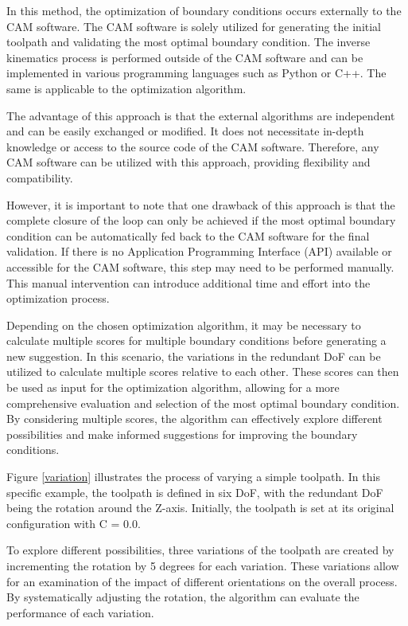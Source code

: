 In this method, the optimization of boundary conditions occurs externally to the CAM software. The CAM software is solely utilized for generating the initial toolpath and validating the most optimal boundary condition. The inverse kinematics process is performed outside of the CAM software and can be implemented in various programming languages such as Python or C++. The same is applicable to the optimization algorithm.

The advantage of this approach is that the external algorithms are independent and can be easily exchanged or modified. It does not necessitate in-depth knowledge or access to the source code of the CAM software. Therefore, any CAM software can be utilized with this approach, providing flexibility and compatibility.    

However, it is important to note that one drawback of this approach is that the complete closure of the loop can only be achieved if the most optimal boundary condition can be automatically fed back to the CAM software for the final validation. If there is no Application Programming Interface (API) available or accessible for the CAM software, this step may need to be performed manually. This manual intervention can introduce additional time and effort into the optimization process.

Depending on the chosen optimization algorithm, it may be necessary to calculate multiple scores for multiple boundary conditions before generating a new suggestion. In this scenario, the variations in the redundant DoF can be utilized to calculate multiple scores relative to each other. These scores can then be used as input for the optimization algorithm, allowing for a more comprehensive evaluation and selection of the most optimal boundary condition. By considering multiple scores, the algorithm can effectively explore different possibilities and make informed suggestions for improving the boundary conditions.

Figure \ref{variation} illustrates the process of varying a simple toolpath. In this specific example, the toolpath is defined in six DoF, with the redundant DoF being the rotation around the Z-axis. Initially, the toolpath is set at its original configuration with C = 0.0.

To explore different possibilities, three variations of the toolpath are created by incrementing the rotation by 5 degrees for each variation. These variations allow for an examination of the impact of different orientations on the overall process. By systematically adjusting the rotation, the algorithm can evaluate the performance of each variation.



